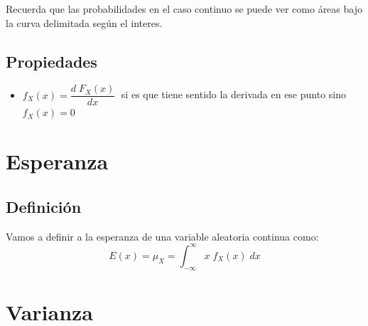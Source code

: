 \documentclass[12pt, fleqn]{report}                             %
\theoremstyle{break}                                            %
\newcommand \Derivate[2] {\dfrac{d \; #1}{d #2}}                %
\begin{document}
                Recuerda que las probabilidades en el caso continuo se puede ver como áreas bajo la curva
                delimitada según el interes.


            \subsection{Propiedades}

                \begin{itemize}
                    \item
                        $f_X(x) = \Derivate{F_X(x)}{x} \;$ si es que tiene sentido la derivada en ese punto
                        sino $f_X(x) = 0$
                \end{itemize}


        \clearpage
        \section{Esperanza}

            \subsection{Definición}

                Vamos a definir a la esperanza de una variable aleatoria continua como:
                \begin{equation*}
                    E(x) = \mu_X = \int_{-\infty}^{\infty} x \; f_X (x) \; dx
                \end{equation*}


        \vspace{1em}
        \section{Varianza}
\end{document}
